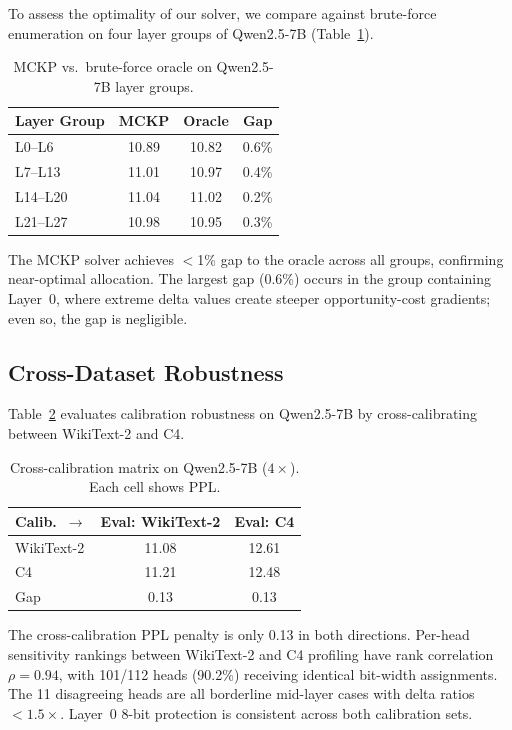 \documentclass[11pt,a4paper]{article}
\begin{document}
To assess the optimality of our solver, we compare against brute-force enumeration on four layer groups of Qwen2.5-7B (Table~\ref{tab:oracle}).

\begin{table}[t]
\centering
\small
\caption{MCKP vs.\ brute-force oracle on Qwen2.5-7B layer groups.}
\label{tab:oracle}
\begin{tabular}{lccc}
\toprule
\textbf{Layer Group} & \textbf{MCKP} & \textbf{Oracle} & \textbf{Gap} \\
\midrule
L0--L6 & 10.89 & 10.82 & 0.6\% \\
L7--L13 & 11.01 & 10.97 & 0.4\% \\
L14--L20 & 11.04 & 11.02 & 0.2\% \\
L21--L27 & 10.98 & 10.95 & 0.3\% \\
\bottomrule
\end{tabular}
\end{table}

The MCKP solver achieves $<$1\% gap to the oracle across all groups, confirming near-optimal allocation.
The largest gap (0.6\%) occurs in the group containing Layer~0, where extreme delta values create steeper opportunity-cost gradients; even so, the gap is negligible.

\subsection{Cross-Dataset Robustness}

Table~\ref{tab:crosscalib} evaluates calibration robustness on Qwen2.5-7B by cross-calibrating between WikiText-2 and C4.

\begin{table}[t]
\centering
\small
\caption{Cross-calibration matrix on Qwen2.5-7B ($4\times$). Each cell shows PPL.}
\label{tab:crosscalib}
\begin{tabular}{lcc}
\toprule
\textbf{Calib.\ $\rightarrow$} & \textbf{Eval: WikiText-2} & \textbf{Eval: C4} \\
\midrule
WikiText-2 & 11.08 & 12.61 \\
C4 & 11.21 & 12.48 \\
\midrule
Gap & 0.13 & 0.13 \\
\bottomrule
\end{tabular}
\end{table}

The cross-calibration PPL penalty is only 0.13 in both directions.
Per-head sensitivity rankings between WikiText-2 and C4 profiling have rank correlation $\rho = 0.94$, with 101/112 heads (90.2\%) receiving identical bit-width assignments.
The 11 disagreeing heads are all borderline mid-layer cases with delta ratios $< 1.5\times$.
Layer~0 8-bit protection is consistent across both calibration sets.
\end{document}
